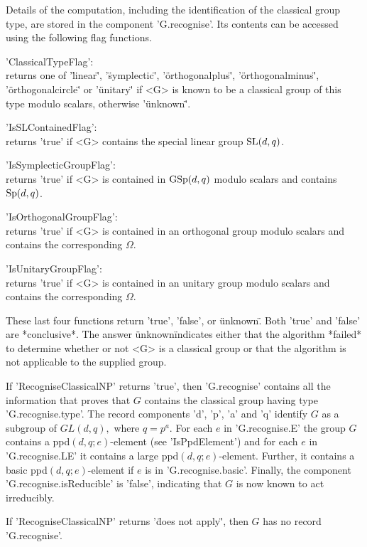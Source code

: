 Details of the computation, including the identification of the classical
group type, are stored in the component  'G.recognise'.  Its contents can
be accessed using the following flag functions.

'ClassicalTypeFlag':\\
    returns   one of '\"linear\"', '\"symplectic\"', '\"orthogonalplus\"',
    '\"orthogonalminus\"', '\"orthogonalcircle\"' or '\"unitary\"' if <G> is 
    known to be a classical group of this type  modulo scalars, 
    otherwise '\"unknown\"'.  

'IsSLContainedFlag':\\
    returns 'true' if <G> contains the special linear group ${\rm SL}(d,q)$.

'IsSymplecticGroupFlag':\\
    returns 'true' if <G> is  contained in ${\rm GSp}(d,q)$ modulo scalars and
    contains ${\rm Sp}(d,q)$.
    
'IsOrthogonalGroupFlag':\\
    returns 'true'  if  <G> is contained  in an  orthogonal group modulo
    scalars and contains the corresponding $\Omega$.
    
'IsUnitaryGroupFlag':\\
    returns 'true' if <G> is contained in an unitary group modulo scalars
    and contains the corresponding $\Omega$.

These  last four functions return 'true', 'false',  or \"unknown\".  Both
'true'  and  'false'  are *conclusive*.  The answer \"unknown\" indicates
either that the algorithm *failed* to  determine  whether or not <G> is a
classical group or  that the algorithm is not applicable  to the supplied
group.

If 'RecogniseClassicalNP' returns 'true', then 'G.recognise' contains all
the information that proves that $G$  contains the classical group having
type  'G.recognise.type'.   The record  components 'd', 'p', 'a' and  'q'
identify $G$ as a subgroup of $GL(d,q),$  where $q= p^a.$ For each $e$ in
'G.recognise.E' the group  $G$  contains  a ppd$( d, q;  e)$-element (see
'IsPpdElement')  and for each $e$ in 'G.recognise.LE' it contains a large
ppd$(d,   q;   e)$-element.   Further,  it  contains   a  basic   ppd$(d,
q;e)$-element if $e$  is in 'G.recognise.basic'.  Finally,  the component
'G.recognise.isReducible' is 'false', indicating that $G$ is now known to
act irreducibly.

If  'RecogniseClassicalNP' returns '\"does not  apply\"', then $G$ has no
record 'G.recognise'.

